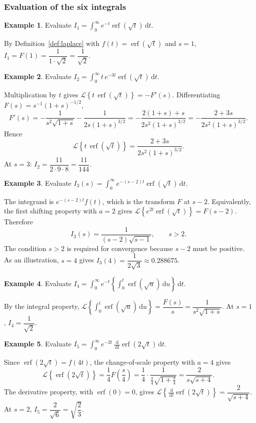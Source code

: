 \documentclass[12pt,a4paper]{article}
\theoremstyle{definition}
\newtheorem{example}{Example}[section]
\theoremstyle{plain}
\theoremstyle{remark}
\newcommand{\erf}{\operatorname{erf}}
\newcommand{\Lap}[1]{\mathcal{L}\!\left\{#1\right\}}
\newcommand{\dd}{\,\mathrm{d}}
\begin{document}
	\subsubsection{Evaluation of the six integrals}
	
	\begin{example}\label{ex:1}
		Evaluate $I_1=\displaystyle\int_0^\infty e^{-t}\erf(\sqrt{t})\dd t$.
		
		By Definition~\ref{def:laplace} with $f(t)=\erf(\sqrt{t})$ and $s=1$, $I_1=F(1)=\dfrac{1}{1\cdot\sqrt{2}}=\dfrac{1}{\sqrt{2}}$.
	\end{example}
	
	\begin{example}\label{ex:2}
		Evaluate $I_2=\displaystyle\int_0^\infty t\,e^{-3t}\erf(\sqrt{t})\dd t$.
		
		Multiplication by $t$ gives $\Lap{t\,\erf(\sqrt{t})}=-F'(s)$. Differentiating $F(s)=s^{-1}(1+s)^{-1/2}$,
		\[
		F'(s)=-\frac{1}{s^2\sqrt{1+s}}-\frac{1}{2s(1+s)^{3/2}}=-\frac{2(1+s)+s}{2s^2(1+s)^{3/2}}=-\frac{2+3s}{2s^2(1+s)^{3/2}} .
		\]
		Hence
		\begin{equation}\label{eq:tF}
			\Lap{t\,\erf(\sqrt{t})}=\frac{2+3s}{2s^2(1+s)^{3/2}} .
		\end{equation}
		At $s=3$: $I_2=\dfrac{11}{2\cdot 9\cdot 8}=\dfrac{11}{144}$.
	\end{example}
	
	\begin{example}\label{ex:3}
		Evaluate $I_3(s)=\displaystyle\int_0^\infty e^{-(s-2)t}\erf(\sqrt{t})\dd t$.
		
		The integrand is $e^{-(s-2)t}f(t)$, which is the transform $F$ at $s-2$. Equivalently, the first shifting property with $a=2$ gives $\Lap{e^{2t}\erf(\sqrt{t})}=F(s-2)$. Therefore
		\[
		I_3(s)=\frac{1}{(s-2)\sqrt{s-1}},\qquad s>2 .
		\]
		The condition $s>2$ is required for convergence because $s-2$ must be positive. As an illustration, $s=4$ gives $I_3(4)=\dfrac{1}{2\sqrt{3}}\approx 0.288675$.
	\end{example}
	
	\begin{example}\label{ex:4}
		Evaluate $I_4=\displaystyle\int_0^\infty e^{-t}\left\{\int_0^t \erf(\sqrt{u})\dd u\right\}\dd t$.
		
		By the integral property, $\Lap{\int_0^t\erf(\sqrt{u})\dd u}=\dfrac{F(s)}{s}=\dfrac{1}{s^2\sqrt{1+s}}$. At $s=1$, $I_4=\dfrac{1}{\sqrt{2}}$.
	\end{example}
	
	\begin{example}\label{ex:5}
		Evaluate $I_5=\displaystyle\int_0^\infty e^{-2t}\,\frac{\dd}{\dd t}\erf(2\sqrt{t})\dd t$.
		
		Since $\erf(2\sqrt{t})=f(4t)$, the change-of-scale property with $a=4$ gives
		\[
		\Lap{\erf(2\sqrt{t})}=\frac{1}{4}F\!\left(\frac{s}{4}\right)=\frac{1}{4}\cdot\frac{1}{\tfrac{s}{4}\sqrt{1+\tfrac{s}{4}}}=\frac{2}{s\sqrt{s+4}} .
		\]
		The derivative property, with $\erf(0)=0$, gives $\Lap{\tfrac{\dd}{\dd t}\erf(2\sqrt{t})}=\dfrac{2}{\sqrt{s+4}}$. At $s=2$, $I_5=\dfrac{2}{\sqrt{6}}=\sqrt{\dfrac{2}{3}}$.
	\end{example}
	
\end{document}
